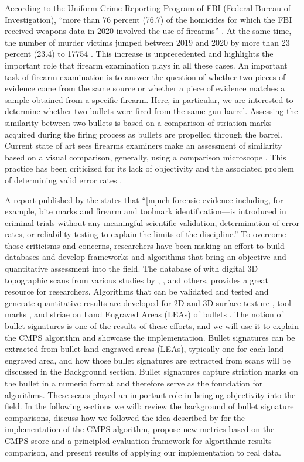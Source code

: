 According to the Uniform Crime Reporting Program of FBI (Federal Bureau
of Investigation), ``more than 76 percent (76.7) of the homicides for
which the FBI received weapons data in 2020 involved the use of
firearms'' \citep{fbiucr}. At the same time, the number of murder
victims jumped between 2019 and 2020 by more than 23 percent (23.4) to
17754 \citep{fbiucr20}. This increase is unprecedented and highlights
the important role that firearm examination plays in all these cases. An
important task of firearm examination is to answer the question of
whether two pieces of evidence come from the same source or whether a
piece of evidence matches a sample obtained from a specific firearm.
Here, in particular, we are interested to determine whether two bullets
were fired from the same gun barrel. Assessing the similarity between
two bullets is based on a comparison of striation marks acquired during
the firing process as bullets are propelled through the barrel. Current
state of art sees firearms examiners make an assessment of similarity
based on a visual comparison, generally, using a comparison microscope
\citep{afte}. This practice has been criticized for its lack of
objectivity and the associated problem of determining valid error rates
\citep{pcast}.

A report published by the \citet{nrc} states that ``{[}m{]}uch forensic
evidence-including, for example, bite marks and firearm and toolmark
identification---is introduced in criminal trials without any meaningful
scientific validation, determination of error rates, or reliability
testing to explain the limits of the discipline.'' To overcome those
criticisms and concerns, researchers have been making an effort to build
databases and develop frameworks and algorithms that bring an objective
and quantitative assessment into the field. The database of
\citet{nistdb} with digital 3D topographic scans from various studies by
\citet{brundage}, \citet{hamby}, \citet{Hamby:2019} and others, provides
a great resource for researchers. Algorithms that can be validated and
tested and generate quantitative results are developed for 2D and 3D
surface texture \citep{song2005}, tool marks
\citep{ChumbleyL_Scott2010VoTM}, and striae on Land Engraved Areas
(LEAs) of bullets \citep[\citet{pmid30444940}, \citet{cmps}]{aoas}. The
notion of bullet signatures is one of the results of these efforts, and
we will use it to explain the CMPS algorithm and showcase the
 implementation. Bullet signatures can be extracted from
bullet land engraved areas (LEAs), typically one for each land engraved
area, and how those bullet signatures are extracted from scans will be
discussed in the Background section. Bullet signatures capture striation
marks on the bullet in a numeric format and therefore serve as the
foundation for algorithms. These scans played an important role in
bringing objectivity into the field. In the following sections we will:
review the background of bullet signature comparisons, discuss how we
followed the idea described by \citet{cmps} for the implementation of
the CMPS algorithm, propose new metrics based on the CMPS score and a
principled evaluation framework for algorithmic results comparison, and
present results of applying our implementation to real data.

